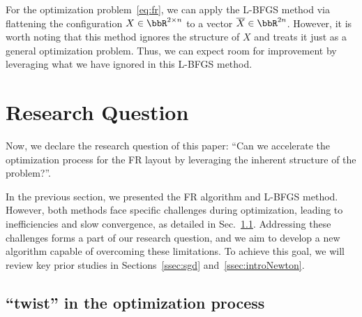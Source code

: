 \documentclass[dvipdfmx,journal]{IEEEtran}
\begin{document}
For the optimization problem~\eqref{eq:fr}, we can apply the L-BFGS method via flattening the configuration $X \in \bbR^{2 \times n}$ to a vector $\overline{X} \in \bbR^{2n}$.
However, it is worth noting that this method ignores the structure of $X$ and treats it just as a general optimization problem.
Thus, we can expect room for improvement by leveraging what we have ignored in this L-BFGS method.

\section{Research Question}\label{sec:RQ}

Now, we declare the research question of this paper: ``Can we accelerate the optimization process for the FR layout by leveraging the inherent structure of the problem?''.

In the previous section, we presented the FR algorithm and L-BFGS method. However, both methods face specific challenges during optimization, leading to inefficiencies and slow convergence, as detailed in Sec.~\ref{ssec:twist}.
Addressing these challenges forms a part of our research question, and we aim to develop a new algorithm capable of overcoming these limitations. To achieve this goal, we will review key prior studies in Sections~\ref{ssec:sgd} and~\ref{ssec:introNewton}.

\subsection{``twist'' in the optimization process}\label{ssec:twist}
\end{document}
